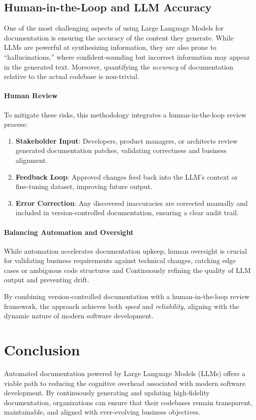 \documentclass[12pt,oneside]{article}
\begin{document}
\subsection{Human-in-the-Loop and LLM Accuracy}
One of the most challenging aspects of using Large Language Models for documentation is ensuring 
the accuracy of the content they generate. While LLMs are powerful at synthesizing information, 
they are also prone to ``hallucinations,'' where confident-sounding but incorrect information may appear 
in the generated text. Moreover, quantifying the \emph{accuracy} of documentation relative to the actual 
codebase is non-trivial.

\paragraph{Human Review}
To mitigate these risks, this methodology integrates a human-in-the-loop review process:
\begin{enumerate}
  \item \textbf{Stakeholder Input}: Developers, product managers, or architects review generated documentation patches, validating correctness and business alignment.
  \item \textbf{Feedback Loop}: Approved changes feed back into the LLM’s context or fine-tuning dataset, improving future output.
  \item \textbf{Error Correction}: Any discovered inaccuracies are corrected manually and included in version-controlled documentation, ensuring a clear audit trail.
\end{enumerate}

\paragraph{Balancing Automation and Oversight}
While automation accelerates documentation upkeep, human oversight is crucial for validating business requirements 
against technical changes, catching edge cases or ambiguous code structures and Continuously refining the quality of 
LLM output and preventing drift.

By combining version-controlled documentation with a human-in-the-loop review framework, the approach achieves both \emph{speed} and \emph{reliability}, aligning with the dynamic nature of modern software development.


\section{Conclusion}
Automated documentation powered by Large Language Models (LLMs) offers a viable path to reducing the cognitive overhead 
associated with modern software development. 
By continuously generating and updating high-fidelity documentation, organizations can ensure that their codebases 
remain transparent, maintainable, and aligned with ever-evolving business objectives. 
\end{document}
